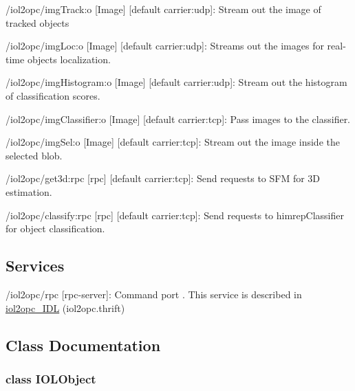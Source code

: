 \begin{DoxyItemize}
\item /iol2opc/img\+Track\+:o \mbox{[}Image\mbox{]} \mbox{[}default carrier\+:udp\mbox{]}\+: Stream out the image of tracked objects
\item /iol2opc/img\+Loc\+:o \mbox{[}Image\mbox{]} \mbox{[}default carrier\+:udp\mbox{]}\+: Streams out the images for real-\/time objects localization.
\item /iol2opc/img\+Histogram\+:o \mbox{[}Image\mbox{]} \mbox{[}default carrier\+:udp\mbox{]}\+: Stream out the histogram of classification scores.
\item /iol2opc/img\+Classifier\+:o \mbox{[}Image\mbox{]} \mbox{[}default carrier\+:tcp\mbox{]}\+: Pass images to the classifier.
\item /iol2opc/img\+Sel\+:o \mbox{[}Image\mbox{]} \mbox{[}default carrier\+:tcp\mbox{]}\+: Stream out the image inside the selected blob.
\item /iol2opc/get3d\+:rpc \mbox{[}rpc\mbox{]} \mbox{[}default carrier\+:tcp\mbox{]}\+: Send requests to S\+FM for 3D estimation.
\item /iol2opc/classify\+:rpc \mbox{[}rpc\mbox{]} \mbox{[}default carrier\+:tcp\mbox{]}\+: Send requests to himrep\+Classifier for object classification.
\end{DoxyItemize}\hypertarget{group__touchDetector_services_sec}{}\subsection{Services}\label{group__touchDetector_services_sec}

\begin{DoxyItemize}
\item /iol2opc/rpc \mbox{[}rpc-\/server\mbox{]}\+: Command port . This service is described in \hyperlink{classiol2opc__IDL}{iol2opc\+\_\+\+I\+DL} (iol2opc.\+thrift) 
\end{DoxyItemize}

\subsection{Class Documentation}
\label{classIOLObject}
\subsubsection{class I\+O\+L\+Object}


